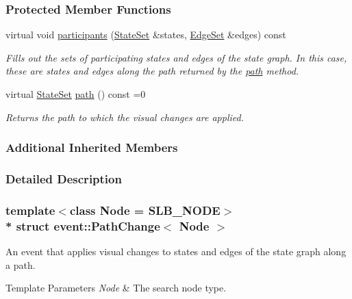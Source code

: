 \subsubsection*{Protected Member Functions}
\begin{DoxyCompactItemize}
\item 
virtual void \hyperlink{structevent_1_1PathChange_ac59e743e16542351947d4eabc9a614c0}{participants} (\hyperlink{structevent_1_1UniformChange_a71997f4cc920d6c5c65fab2049d5e42d}{State\+Set} \&states, \hyperlink{structevent_1_1UniformChange_a01841b7c7ff05760a96c8b239f82a29c}{Edge\+Set} \&edges) const 
\begin{DoxyCompactList}\small\item\em Fills out the sets of participating states and edges of the state graph. In this case, these are states and edges along the path returned by the \hyperlink{structevent_1_1PathChange_a60309c4327aa98364fdc2d6d49b49358}{path} method. \end{DoxyCompactList}\item 
virtual \hyperlink{structevent_1_1UniformChange_a71997f4cc920d6c5c65fab2049d5e42d}{State\+Set} \hyperlink{structevent_1_1PathChange_a60309c4327aa98364fdc2d6d49b49358}{path} () const =0
\begin{DoxyCompactList}\small\item\em Returns the path to which the visual changes are applied. \end{DoxyCompactList}\end{DoxyCompactItemize}
\subsubsection*{Additional Inherited Members}


\subsubsection{Detailed Description}
\subsubsection*{template$<$class Node = S\+L\+B\+\_\+\+N\+O\+DE$>$\\*
struct event\+::\+Path\+Change$<$ Node $>$}

An event that applies visual changes to states and edges of the state graph along a path. 


\begin{DoxyTemplParams}{Template Parameters}
{\em Node} & The search node type. \\
\hline
\end{DoxyTemplParams}


